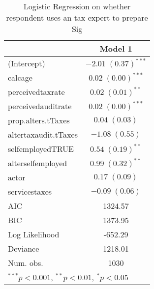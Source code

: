 
\begin{table}
\begin{tabular}{l c }
\hline
 & Model 1 \\
\hline
(Intercept)          & $-2.01 \; (0.37)^{***}$ \\
calcage              & $0.02 \; (0.00)^{***}$  \\
perceivedtaxrate     & $0.02 \; (0.01)^{**}$   \\
perceivedauditrate   & $0.02 \; (0.00)^{***}$  \\
prop.alters.tTaxes   & $0.04 \; (0.03)$        \\
altertaxaudit.tTaxes & $-1.08 \; (0.55)$       \\
selfemployedTRUE     & $0.54 \; (0.19)^{**}$   \\
alterselfemployed    & $0.99 \; (0.32)^{**}$   \\
actor                & $0.17 \; (0.09)$        \\
servicestaxes        & $-0.09 \; (0.06)$       \\
\hline
AIC                  & 1324.57                 \\
BIC                  & 1373.95                 \\
Log Likelihood       & -652.29                 \\
Deviance             & 1218.01                 \\
Num. obs.            & 1030                    \\
\hline
\multicolumn{2}{l}{\scriptsize{$^{***}p<0.001$, $^{**}p<0.01$, $^*p<0.05$}}
\end{tabular}
\caption{Logistic Regression on whether respondent uses an tax expert to prepare Sig}
\label{table:coefficients}
\end{table}
